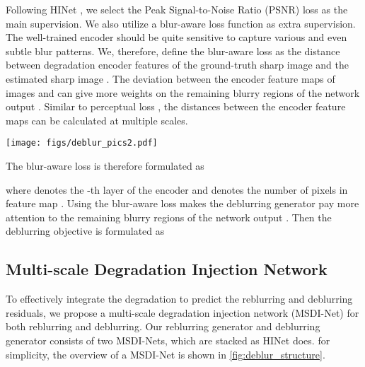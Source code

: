 \documentclass[runningheads]{llncs}
\begin{document}
Following HINet \cite{HINet}, we select the Peak Signal-to-Noise Ratio (PSNR) loss as the main supervision. We also utilize a blur-aware loss function as extra supervision. The well-trained encoder  should be quite sensitive to capture various and even subtle blur patterns. We, therefore, define the blur-aware loss as the distance between degradation encoder features of the ground-truth sharp image  and the estimated sharp image . 
The deviation between the encoder feature maps  of images  and  can give more weights on the remaining blurry regions of the network output . Similar to perceptual loss \cite{Johnson2016Perceptual}, the  distances between the encoder feature maps can be calculated at multiple scales.
\begin{figure*}[t]
  \centering
   \texttt{[image: figs/deblur\_pics2.pdf]}
   \caption{The network structure of multi-scale degradation injection network for image deblurring. Image reblurring shares the same structure.}
   \label{fig:deblur_structure}
\end{figure*}
The blur-aware loss  is therefore formulated as

where  denotes the -th layer of the encoder  and  denotes the number of pixels in feature map . Using the blur-aware loss makes the deblurring generator  pay more attention to the remaining blurry regions of the network output .
Then the deblurring objective is formulated as





\subsection{Multi-scale Degradation Injection Network}

To effectively integrate the degradation  to predict the reblurring and deblurring residuals, we propose a multi-scale degradation injection network (MSDI-Net) for both reblurring and deblurring.  Our reblurring generator  and deblurring generator  consists of two MSDI-Nets, which are stacked as HINet \cite{HINet} does. for simplicity, the overview of a MSDI-Net is shown in \cref{fig:deblur_structure}. 
\end{document}

